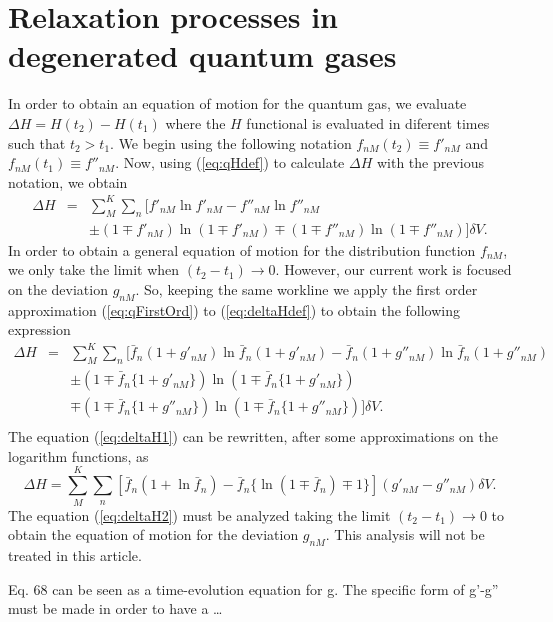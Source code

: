
  \section{Relaxation processes in degenerated quantum gases}\label{sec:relaxproc}
In order to obtain an equation of motion for the quantum gas, we evaluate 
$\Delta H=H(t_2)-H(t_1)$ where the $H$ functional is evaluated in diferent times such that $t_2 > t_1$.
We begin using the following notation $f_{nM}(t_2)\equiv f'_{nM}$ and 
$f_{nM}(t_1) \equiv f''_{nM}$. 
Now, using (\ref{eq:qHdef}) to calculate $\Delta H$ with the previous notation, we obtain
\begin{eqnarray} \label{eq:deltaHdef}
	\Delta H &=& \sum_{M}^{K}\sum_n [f'_{nM} \ln f'_{nM} - f''_{nM}	\ln f''_{nM}\nonumber \\ 
			&&\pm (1\mp f'_{nM}) \ln(1\mp f'_{nM}) \mp (1\mp f''_{nM}) \ln (1\mp f''_{nM})]\delta V.  
\end{eqnarray}
In order to obtain a general equation of motion for the distribution function 
$f_{nM}$, we only take the limit when $(t_2-t_1) \rightarrow 0 $. 
However, our current work is focused on the deviation $g_{nM}$. So, keeping the same workline
we apply the first order approximation (\ref{eq:qFirstOrd}) to (\ref{eq:deltaHdef}) to obtain the following expression
\begin{eqnarray}\label{eq:deltaH1}
	\Delta H &=& \sum_{M}^{K} \sum_n [\bar{f}_n(1+g'_{nM}) \ln \bar{f}_{n}(1+g'_{nM})  -  
			\bar{f}_n(1+g''_{nM}) \ln \bar{f}_n(1+g''_{nM}) \nonumber \\
		    &&  \pm (1 \mp \bar{f}_n \{1+g'_{nM}\}) \ln (1\mp \bar{f}_n\{1+g'_{nM} \})\nonumber \\
		    &&  \mp (1\mp \bar{f}_n \{ 1+g''_{nM} \}) \ln (1\mp \bar{f}_n \{1+g''_{nM} \})]\delta V.\nonumber \\
\end{eqnarray} 
The equation (\ref{eq:deltaH1}) can be rewritten, after some approximations on the logarithm functions, as
\begin{equation}\label{eq:deltaH2}
\Delta H = \sum_{M}^{K}\sum_n [\bar{f}_n(1+\ln \bar{f}_n)-\bar{f}_n \{\ln(1\mp \bar{f}_n)\mp 1 \}](g'_{nM}-g''_{nM})\delta V.
\end{equation}
The equation (\ref{eq:deltaH2}) must be analyzed taking the limit $(t_2-t_1) \rightarrow 0$ 
to obtain the equation of motion for the deviation $g_{nM}$.
This analysis will not be treated in this article.

Eq. 68 can be seen as a time-evolution equation for  g. The specific form of g'-g''
must be made in order to have a \dots


  



